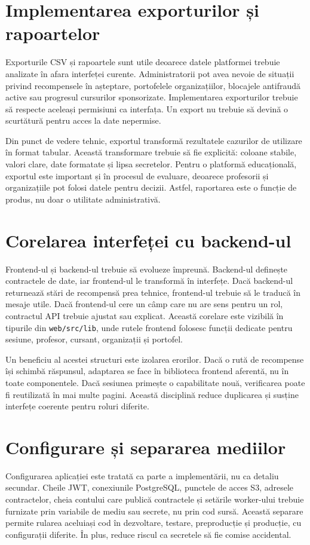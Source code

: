 \section{Implementarea exporturilor și rapoartelor}
Exporturile CSV și rapoartele sunt utile deoarece datele platformei trebuie analizate în afara interfeței curente. Administratorii pot avea nevoie de situații privind recompensele în așteptare, portofelele organizațiilor, blocajele antifraudă active sau progresul cursurilor sponsorizate. Implementarea exporturilor trebuie să respecte aceleași permisiuni ca interfața. Un export nu trebuie să devină o scurtătură pentru acces la date nepermise.

Din punct de vedere tehnic, exportul transformă rezultatele cazurilor de utilizare în format tabular. Această transformare trebuie să fie explicită: coloane stabile, valori clare, date formatate și lipsa secretelor. Pentru o platformă educațională, exportul este important și în procesul de evaluare, deoarece profesorii și organizațiile pot folosi datele pentru decizii. Astfel, raportarea este o funcție de produs, nu doar o utilitate administrativă.

\section{Corelarea interfeței cu backend-ul}
Frontend-ul și backend-ul trebuie să evolueze împreună. Backend-ul definește contractele de date, iar frontend-ul le transformă în interfețe. Dacă backend-ul returnează stări de recompensă prea tehnice, frontend-ul trebuie să le traducă în mesaje utile. Dacă frontend-ul cere un câmp care nu are sens pentru un rol, contractul API trebuie ajustat sau explicat. Această corelare este vizibilă în tipurile din \texttt{web/src/lib}, unde rutele frontend folosesc funcții dedicate pentru sesiune, profesor, cursant, organizații și portofel.

Un beneficiu al acestei structuri este izolarea erorilor. Dacă o rută de recompense își schimbă răspunsul, adaptarea se face în biblioteca frontend aferentă, nu în toate componentele. Dacă sesiunea primește o capabilitate nouă, verificarea poate fi reutilizată în mai multe pagini. Această disciplină reduce duplicarea și susține interfețe coerente pentru roluri diferite.

\section{Configurare și separarea mediilor}
Configurarea aplicației este tratată ca parte a implementării, nu ca detaliu secundar. Cheile JWT, conexiunile PostgreSQL, punctele de acces S3, adresele contractelor, cheia contului care publică contractele și setările worker-ului trebuie furnizate prin variabile de mediu sau secrete, nu prin cod sursă. Această separare permite rularea aceluiași cod în dezvoltare, testare, preproducție și producție, cu configurații diferite. În plus, reduce riscul ca secretele să fie comise accidental.

